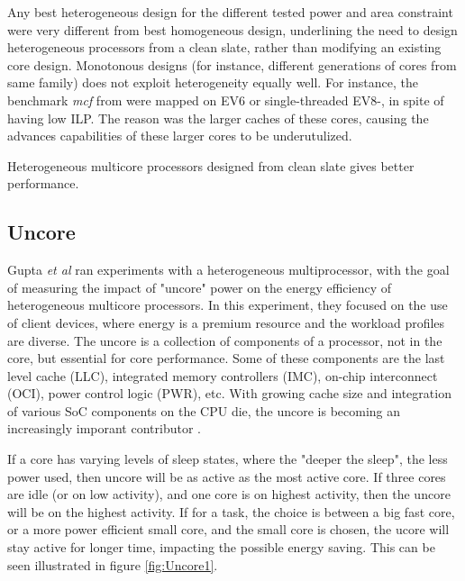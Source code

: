 Any best heterogeneous design for the different tested power and area constraint were very different from best homogeneous design, underlining the need to design heterogeneous processors from a clean slate, rather than modifying an existing core design.
Monotonous designs (for instance, different generations of cores from same family) does not exploit heterogeneity equally well.
For instance, the benchmark \textit{mcf} from \cite{heterogeneous-ee} were mapped on EV6 or single-threaded EV8-, in spite of having low ILP.
The reason was the larger caches of these cores, causing the advances capabilities of these larger cores to be underutulized.

Heterogeneous multicore processors designed from clean slate gives better performance.

\subsection{Uncore}
\label{subsec:rw_uncore}
Gupta \textit{et al}\cite{heterogeneous-uncore} ran experiments with a heterogeneous multiprocessor, with the goal of measuring the impact of "uncore" power on the energy efficiency of heterogeneous multicore processors.
In this experiment, they focused on the use of client devices, where energy is a premium resource and the workload profiles are diverse.
The uncore is a collection of components of a processor, not in the core, but essential for core performance.
Some of these components are the last level cache (LLC), integrated memory controllers (IMC), on-chip interconnect (OCI), power control logic (PWR), etc.
With growing cache size and integration of various SoC components on the CPU die, the uncore is becoming an increasingly imporant contributor \cite{heterogeneous-uncore}.

If a core has varying levels of sleep states, where the "deeper the sleep", the less power used, then uncore will be as active as the most active core.
If three cores are idle (or on low activity), and one core is on highest activity, then the uncore will be on the highest activity.
If for a task, the choice is between a big fast core, or a more power efficient small core, and the small core is chosen, the ucore will stay active for longer time, impacting the possible energy saving.
This can be seen illustrated in figure \ref{fig:Uncore1}.

